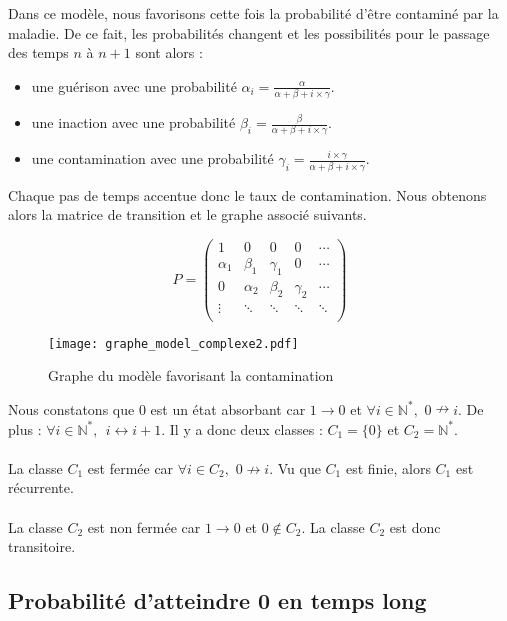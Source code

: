 \documentclass[12pt,a4paper]{report}
\theoremstyle{remark}
\begin{document}
Dans ce modèle, nous favorisons cette fois la probabilité d'être contaminé par la maladie. De ce fait, les probabilités changent et les possibilités pour le passage des temps $n$ à $n+1$ sont alors :
\\
\begin{itemize}
\item une guérison avec une probabilité $\alpha_i=\frac{\alpha}{\alpha + \beta + i \times \gamma}.$
\item une inaction avec une probabilité $\beta_i=\frac{\beta}{\alpha + \beta + i \times \gamma}.$
\item une contamination avec une probabilité $\gamma_i=\frac{i \times \gamma}{\alpha + \beta + i \times \gamma}.$
\end{itemize}
\vspace{0.5cm}

Chaque pas de temps accentue donc le taux de contamination. Nous obtenons alors la matrice de transition et le graphe associé suivants.

$$P=
\begin{pmatrix}
        1 & 0 & 0 & 0 & \cdots \\ 
         \alpha_1 & \beta_1 & \gamma_1 & 0 & \cdots\\
         0 & \alpha_2 & \beta_2 & \gamma_2 & \cdots\\
        \vdots &\ddots & \ddots & \ddots & \ddots \\ 
\end{pmatrix}$$
\begin{figure}[h]
    \centering
\texttt{[image: graphe\_model\_complexe2.pdf]} 
\caption{Graphe du modèle favorisant la contamination}
    \label{fig:my_label2}
\end{figure}


Nous constatons que 0 est un état absorbant car $1 \longrightarrow 0$ et $\forall i \in \mathbb{N}^*, \, \, 0 \nrightarrow i$. De plus : $\forall i \in \mathbb{N}^*,\ \  i \longleftrightarrow i+1$. Il y a donc deux classes : $C_1=\{0\}$ et $C_2=\mathbb{N}^*.$
\\
\\
La classe $C_1$ est fermée car $\forall i \in C_2, \, \, 0 \nrightarrow i$. Vu que $C_1$ est finie, alors $C_1$ est récurrente.
\\
\\
La classe $C_2$ est non fermée car $1 \rightarrow 0$ et $0 \notin C_2$. La classe $C_2$ est donc transitoire.

\subsection{Probabilité d'atteindre 0 en temps long}
\vspace{0.6cm}
\end{document}
